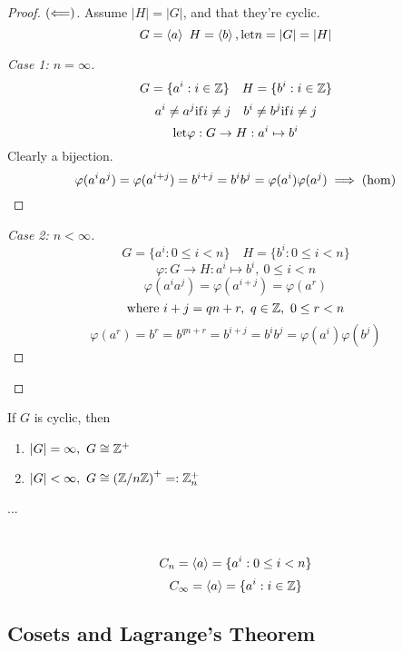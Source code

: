 \documentclass[12pt]{article}
\newcommand{\order}[1]{\left\lvert#1\right\rvert}
\newcommand\vphi{\varphi}
\begin{document}
\bboxproof
\begin{proof}
    \((\Longleftarrow)\). Assume \(|H|=|G|\), and that they're cyclic.
    \[
        G=\gen{a} \ H=\gen{b} ,\llet n=|G|=|H|
    \]
    \bboxproof
    \begin{proof}[Case 1: \(n=\infty\)]\ 
        \[
            G=\{a^i:i\in\mathbb Z\}\quad H=\{b^i:i\in\mathbb Z\}
        \]
        \[
            a^i\neq a^j\mathrm{if} i\neq j\quad b^i\neq b^j\mathrm{if} i\neq j
        \]
        \[
            \llet \vphi : G \to H : a^i\mapsto b^i
        \]
        Clearly a bijection.
        \[
            \vphi(a^ia^j)=\vphi(a^{i+j})=b^{i+j}=b^ib^j=\vphi(a^i)\vphi(a^j)
            \implies\TM{hom}
        \]
    \end{proof}
    \ebox
    \bboxproof
    \begin{proof}[Case 2: \(n<\infty\)]
        \[
            G = \{a^i : 0\le i<n\}\quad
            H = \{b^i : 0\le i<n\}
        \]
        \[
            \vphi:G\to H:a^i\mapsto b^i,\ 0\le i<n
        \]
        \[
            \vphi(a^ia^j)=\vphi(a^{i+j})=\vphi(a^r)
        \]
        \[
            \mathrm{where}\ i+j=qn+r,\ q\in\mathbb Z,\ 0\le r<n
        \]
        \[
            \vphi(a^r)=b^r=b^{qn+r}=b^{i+j}=b^ib^j=
            \vphi(a^i)\vphi(b^j)
        \]
    \end{proof}
    \ebox
\end{proof}
\ebox

\bboxcoro
\begin{coro}
    If \(G\) is cyclic, then
    \begin{enumerate}
        \item \(\order{G}=\infty,\ G\isom\Z^+\)
        \item \(\order{G}<\infty,\ G\isom\left(\Z/n\Z\right)^+=:\Z^+_n\)
    \end{enumerate}
\end{coro}
\ebox

\bboxcoro
\begin{coro}
    ...
\end{coro}
\ebox


\bboxnota
\begin{nota}\
    \[
        C_n=\left\langle a\right\rangle=\{a^i : 0\le i< n\}
    \]
    \[
        C_\infty = \left\langle a\right\rangle = \{ a^i : i \in \mathbb Z \}
    \]
\end{nota}
\ebox

\subsection{Cosets and Lagrange's Theorem}
\end{document}
